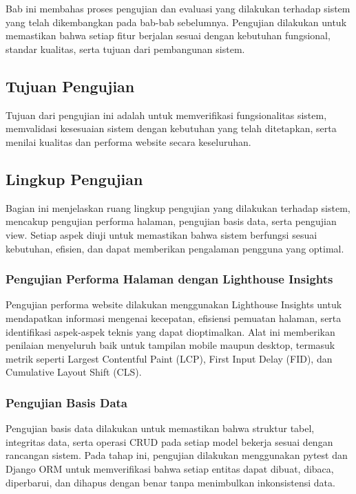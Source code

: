 \chapter{\babEmpat}
Bab ini membahas proses pengujian dan evaluasi yang dilakukan terhadap sistem yang telah dikembangkan pada bab-bab sebelumnya. Pengujian dilakukan untuk memastikan bahwa setiap fitur berjalan sesuai dengan kebutuhan fungsional, standar kualitas, serta tujuan dari pembangunan sistem.

\section{Tujuan Pengujian}
Tujuan dari pengujian ini adalah untuk memverifikasi fungsionalitas sistem, memvalidasi kesesuaian sistem dengan kebutuhan yang telah ditetapkan, serta menilai kualitas dan performa website secara keseluruhan.

\section{Lingkup Pengujian}
Bagian ini menjelaskan ruang lingkup pengujian yang dilakukan terhadap sistem, mencakup pengujian performa halaman, pengujian basis data, serta pengujian view. Setiap aspek diuji untuk memastikan bahwa sistem berfungsi sesuai kebutuhan, efisien, dan dapat memberikan pengalaman pengguna yang optimal.
\subsection{Pengujian Performa Halaman dengan Lighthouse Insights}
Pengujian performa website dilakukan menggunakan Lighthouse Insights untuk mendapatkan informasi mengenai kecepatan, efisiensi pemuatan halaman, serta identifikasi aspek-aspek teknis yang dapat dioptimalkan. Alat ini memberikan penilaian menyeluruh baik untuk tampilan mobile maupun desktop, termasuk metrik seperti Largest Contentful Paint (LCP), First Input Delay (FID), dan Cumulative Layout Shift (CLS).
\subsection{Pengujian Basis Data}
Pengujian basis data dilakukan untuk memastikan bahwa struktur tabel, integritas data, serta operasi CRUD pada setiap model bekerja sesuai dengan rancangan sistem. Pada tahap ini, pengujian dilakukan menggunakan pytest dan Django ORM untuk memverifikasi bahwa setiap entitas dapat dibuat, dibaca, diperbarui, dan dihapus dengan benar tanpa menimbulkan inkonsistensi data.
